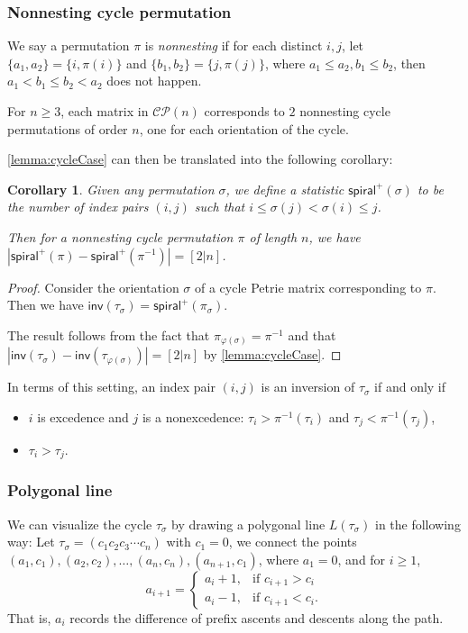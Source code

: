 \documentclass[pdflatex,sn-mathphys-num]{sn-jnl}%
\theoremstyle{thmstyleone}%
\newtheorem{corollary}[theorem]{Corollary}
\theoremstyle{thmstyletwo}%
\theoremstyle{thmstylethree}%
\numberwithin{equation}{section}
\newcommand{\inv}{\mathsf{inv}}
\begin{document}
        \subsubsection{Nonnesting cycle permutation}
            We say a permutation $\pi$ is \textit{nonnesting} if for each distinct $i,j$, let $\{a_1,a_2\}=\{i,\pi(i)\}$ and $\{b_1,b_2\}=\{j,\pi(j)\}$, where $a_1\leq a_2,b_1\leq b_2$, then $a_1<b_1\leq b_2<a_2$ does not happen. 

            For $n\geq 3$, each matrix in $\mathcal{CP}(n)$ corresponds to \textbf{$2$} nonnesting cycle permutations of order $n$, one for each orientation of the cycle.

            \cref{lemma:cycleCase} can then be translated into the following corollary:
            \newcommand{\spin}{\mathsf{spiral}^+}
            \begin{corollary}\label{Cor:cycleCaseCor}
                Given any permutation $\sigma$, we define a statistic $\spin(\sigma)$ to be the number of index pairs $(i,j)$ such that $i\leq \sigma(j)<\sigma(i)\leq j$.

                Then for a nonnesting cycle permutation $\pi$ of length $n$, we have $|\spin(\pi)-\spin(\pi^{-1})|=[2|n]$.
            \end{corollary}
            \begin{proof}
                Consider the orientation $\sigma$ of a cycle Petrie matrix corresponding to $\pi$. Then we have $\inv(\tau_\sigma)=\spin(\pi_\sigma)$.

                The result follows from the fact that $\pi_{\varphi(\sigma)}=\pi^{-1}$ and that $|\inv(\tau_\sigma)-\inv(\tau_{\varphi(\sigma)})|=[2|n]$ by \cref{lemma:cycleCase}.
            \end{proof}
            In terms of this setting, an index pair $(i,j)$ is an inversion of $\tau_\sigma$ if and only if 
            \begin{itemize}
                \item $i$ is excedence and $j$ is a nonexcedence: $\tau_i>\pi^{-1}(\tau_i)$ and $\tau_j<\pi^{-1}(\tau_j)$,
                \item $\tau_i>\tau_j$.
            \end{itemize}

        \subsubsection{Polygonal line}
            We can visualize the cycle $\tau_\sigma$ by drawing a polygonal line $L(\tau_\sigma)$ in the following way: Let $\tau_\sigma=(c_1c_2c_3\cdots c_n)$ with $c_1=0$, we connect the points $(a_1,c_1), (a_2,c_2),\dotsc,(a_n,c_n),(a_{n+1},c_1)$, where $a_1=0$, and for $i\geq 1$, 
            \[a_{i+1}=\begin{cases}
                a_i+1, &\text{if } c_{i+1}>c_i\\
                a_i-1, &\text{if } c_{i+1}<c_i.
            \end{cases}\] 
        That is, $a_i$ records the difference of prefix ascents and descents along the path. 
\end{document}

